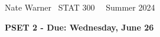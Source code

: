 \documentclass{report}
\title{\Huge{}}
\author{\huge{Nathan Warner}}
\date{\huge{}}
\begin{document}
    \pagebreak \bigbreak \noindent
    Nate Warner \ \quad \quad \quad \quad \quad \quad \quad \quad \quad \quad \quad \quad  STAT 300 \quad  \quad \quad \quad \quad \quad \quad \quad \quad \ \ \quad Summer 2024
    \begin{center}
        \textbf{PSET 2 - Due: Wednesday, June 26}
    \end{center}
    \bigbreak \noindent 
    
\end{document}
